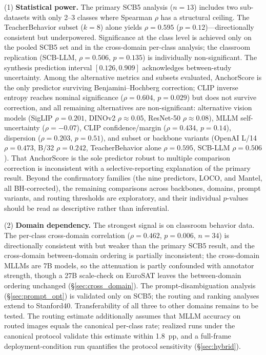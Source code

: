 \documentclass[11pt,a4paper]{article}
\begin{document}
(1) \textbf{Statistical power.} The primary SCB5 analysis ($n=13$) includes two sub-datasets with only 2--3 classes where Spearman $\rho$ has a structural ceiling. The TeacherBehavior subset ($k=8$) alone yields $\rho=0.595$ ($p=0.12$)---directionally consistent but underpowered. Significance at the class level is achieved only on the pooled SCB5 set and in the cross-domain per-class analysis; the classroom replication (SCB-LLM, $\rho=0.506$, $p=0.135$) is individually non-significant. The synthesis prediction interval $[0.126, 0.909]$ acknowledges between-study uncertainty. Among the alternative metrics and subsets evaluated, AnchorScore is the only predictor surviving Benjamini--Hochberg correction; CLIP inverse entropy reaches nominal significance ($\rho=0.604$, $p=0.029$) but does not survive correction, and all remaining alternatives are non-significant: alternative vision models (SigLIP $\rho=0.201$, DINOv2 $\rho\approx0.05$, ResNet-50 $\rho\approx0.08$), MLLM self-uncertainty ($\rho=-0.07$), CLIP confidence/margin ($\rho=0.434$, $p=0.14$), dispersion ($\rho=0.203$, $p=0.51$), and subset or backbone variants (OpenAI L/14 $\rho=0.473$, B/32 $\rho=0.242$, TeacherBehavior alone $\rho=0.595$, SCB-LLM $\rho=0.506$). That AnchorScore is the sole predictor robust to multiple comparison correction is inconsistent with a selective-reporting explanation of the primary result. Beyond the confirmatory families (the nine predictors, LOCO, and Mantel, all BH-corrected), the remaining comparisons across backbones, domains, prompt variants, and routing thresholds are exploratory, and their individual $p$-values should be read as descriptive rather than inferential.

(2) \textbf{Domain dependency.} The strongest signal is on classroom behavior data. The per-class cross-domain correlation ($\rho=0.462$, $p=0.006$, $n=34$) is directionally consistent with but weaker than the primary SCB5 result, and the cross-domain between-domain ordering is partially inconsistent; the cross-domain MLLMs are 7B models, so the attenuation is partly confounded with annotator strength, though a 27B scale-check on EuroSAT leaves the between-domain ordering unchanged (\S\ref{sec:cross_domain}). The prompt-disambiguation analysis (\S\ref{sec:prompt_opt}) is validated only on SCB5; the routing and ranking analyses extend to Stanford40. Transferability of all three to other domains remains to be tested. The routing estimate additionally assumes that MLLM accuracy on routed images equals the canonical per-class rate; realized runs under the canonical protocol validate this estimate within 1.8~pp, and a full-frame deployment-condition run quantifies the protocol sensitivity (\S\ref{sec:hybrid}).
\end{document}
